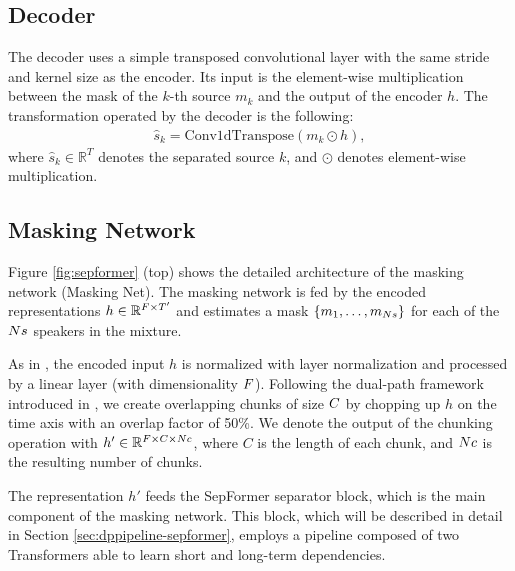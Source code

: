 \documentclass[lettersize,journal]{IEEEtran}
\begin{document}
\subsection{Decoder}
The decoder uses a simple transposed convolutional layer with the same stride and kernel size as the encoder. Its input is the element-wise multiplication between the mask of the  $k$-th source $m_k$ and the output of the encoder $h$. The transformation operated by the decoder is the following: 
\begin{align}
    \widehat {s}_k = \text{Conv1dTranspose}(m_k \odot h), 
\end{align}
where $\widehat{s}_k \in \mathbb R^T$ denotes the separated source $k$, and $\odot$ denotes element-wise multiplication. 


\subsection{Masking Network}
\label{sec:maskingnetwork}
Figure \ref{fig:sepformer} (top) shows the detailed architecture of the masking network (Masking Net).
The masking network is fed by the encoded representations $h \in \mathbb R^{F \times T'}$ and estimates a mask $\{m_1,\dots,m_{Ns}\}$ for each of the $Ns$ speakers in the mixture. 

As in \cite{luo2018convtasnet}, the encoded input $h$ is normalized with layer normalization \cite{layernorm} and processed by a linear layer (with dimensionality $F$). 
Following the dual-path framework introduced in \cite{luo2020dualpath}, we create overlapping chunks of size $C$ by chopping up $h$ on the time axis with an overlap factor of 50\%. We denote the output of the chunking operation with $h' \in \mathbb R^{F \times C \times Nc}$, where $C$ is the length of each chunk, and $Nc$ is the resulting number of chunks. 

The representation $h'$ feeds the SepFormer separator block, which is the main component of the masking network. This block, which will be described in detail in Section \ref{sec:dppipeline-sepformer}, employs a pipeline composed of two Transformers able to learn short and long-term dependencies.  
\end{document}
